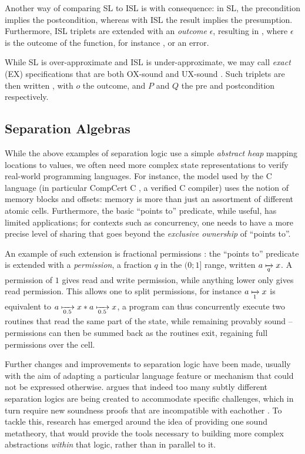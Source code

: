 Another way of comparing SL to ISL is with consequence: in SL, the precondition implies the postcondition, whereas with ISL the result implies the presumption. Furthermore, ISL triplets are extended with an \emph{outcome} $\epsilon$, resulting in , where $\epsilon$ is the outcome of the function, for instance \Ok, or an error.

While SL is over-approximate and ISL is under-approximate, we may call \emph{exact} (EX) specifications that are both OX-sound and UX-sound \cite{exactsl}. Such triplets are then written , with $o$ the outcome, and $P$ and $Q$ the pre and postcondition respectively.

\subsection{Separation Algebras}
\label{subsec:separation-algebras}

While the above examples of separation logic use a simple \emph{abstract heap} mapping locations to values, we often need more complex state representations to verify real-world programming languages. For instance, the model used by the C language (in particular CompCert C \cite{compcert}, a verified C compiler) uses the notion of memory blocks and offsets: memory is more than just an assortment of different atomic cells. Furthermore, the basic ``points to'' predicate, while useful, has limited applications; for contexts such as concurrency, one needs to have a more precise level of sharing that goes beyond the \emph{exclusive ownership} of ``points to''.

An example of such extension is fractional permissions \cite{fracpermissions, fracpermissions2}: the ``points to'' predicate is extended with a \emph{permission}, a fraction $q$ in the $(0;1]$ range, written $a \mapstoq{q} x$. A permission of $1$ gives read and write permission, while anything lower only gives read permission. This allows one to split permissions, for instance $a \mapstoq{1} x$ is equivalent to $a\mapstoq{0.5}x * a\mapstoq{0.5}x$, a program can thus concurrently execute two routines that read the same part of the state, while remaining provably sound -- permissions can then be summed back as the routines exit, regaining full permissions over the cell.

Further changes and improvements to separation logic have been made, usually with the aim of adapting a particular language feature or mechanism that could not be expressed otherwise.  \cite{next700seplogics} argues that indeed too many subtly different separation logics are being created to accommodate specific challenges, which in turn require new soundness proofs that are incompatible with eachother \cite{sljungle}. To tackle this, research has emerged around the idea of providing one sound metatheory, that would provide the tools necessary to building more complex abstractions \emph{within} that logic, rather than in parallel to it.

